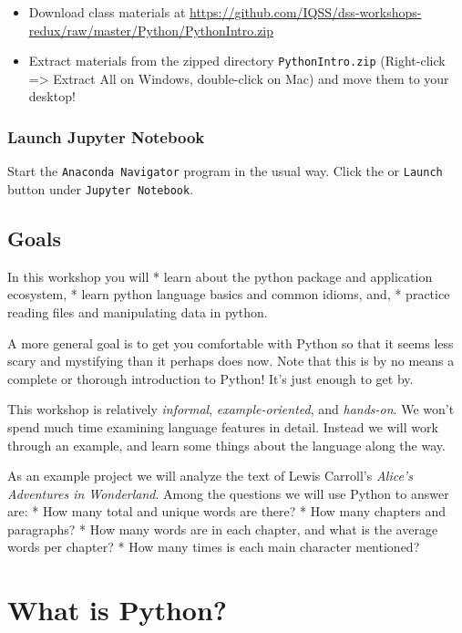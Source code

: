 \documentclass[]{book}
\providecommand{\tightlist}{%
  \setlength{\itemsep}{0pt}\setlength{\parskip}{0pt}}
\begin{document}
\begin{itemize}
\tightlist
\item
  Download class materials at
  \url{https://github.com/IQSS/dss-workshops-redux/raw/master/Python/PythonIntro.zip}
\item
  Extract materials from the zipped directory \texttt{PythonIntro.zip}
  (Right-click =\textgreater{} Extract All on Windows, double-click on
  Mac) and move them to your desktop!
\end{itemize}

\subsubsection{Launch Jupyter Notebook}\label{launch-jupyter-notebook}

Start the \texttt{Anaconda\ Navigator} program in the usual way. Click
the or \texttt{Launch} button under \texttt{Jupyter\ Notebook}.

\subsection{Goals}\label{goals-3}

In this workshop you will * learn about the python package and
application ecosystem, * learn python language basics and common idioms,
and, * practice reading files and manipulating data in python.

A more general goal is to get you comfortable with Python so that it
seems less scary and mystifying than it perhaps does now. Note that this
is by no means a complete or thorough introduction to Python! It's just
enough to get by.

This workshop is relatively \emph{informal}, \emph{example-oriented},
and \emph{hands-on}. We won't spend much time examining language
features in detail. Instead we will work through an example, and learn
some things about the language along the way.

As an example project we will analyze the text of Lewis Carroll's
\emph{Alice's Adventures in Wonderland}. Among the questions we will use
Python to answer are: * How many total and unique words are there? * How
many chapters and paragraphs? * How many words are in each chapter, and
what is the average words per chapter? * How many times is each main
character mentioned?

\section{What is Python?}\label{what-is-python}
\end{document}
